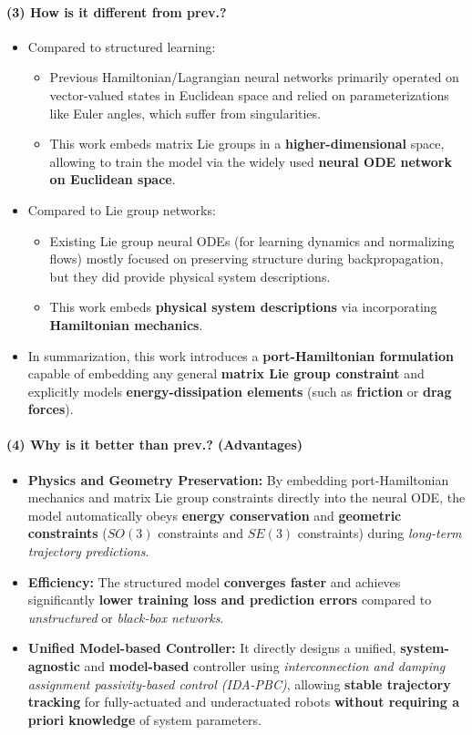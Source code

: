 \documentclass{article}
\begin{document}
\paragraph{(3) How is it different from prev.?}
\begin{itemize}
  \item Compared to structured learning:
  \begin{itemize}
    \item Previous Hamiltonian/Lagrangian neural networks primarily operated on vector-valued states in Euclidean space and relied on parameterizations like Euler angles, which suffer from singularities.
    \item This work embeds matrix Lie groups in a \textbf{higher-dimensional} space, allowing to train the model via the widely used \textbf{neural ODE network on Euclidean space}.
  \end{itemize}
  \item Compared to Lie group networks:
  \begin{itemize}
    \item Existing Lie group neural ODEs (for learning dynamics and normalizing flows) mostly focused on preserving structure during backpropagation, but they did provide physical system descriptions.
    \item This work embeds \textbf{physical system descriptions} via incorporating \textbf{Hamiltonian mechanics}.
  \end{itemize}
  \item In summarization, this work introduces a \textbf{port-Hamiltonian formulation} capable of embedding any general \textbf{matrix Lie group constraint} and explicitly models \textbf{energy-dissipation elements} (such as \textbf{friction} or \textbf{drag forces}).
\end{itemize}

\paragraph{(4) Why is it better than prev.? (Advantages)} 
\begin{itemize}
  \item \textbf{Physics and Geometry Preservation:} By embedding port-Hamiltonian mechanics and matrix Lie group constraints directly into the neural ODE, the model automatically obeys \textbf{energy conservation} and \textbf{geometric constraints} ($SO(3)$ constraints and $SE(3)$ constraints) during \textit{long-term trajectory predictions}.
  \item \textbf{Efficiency:} The structured model \textbf{converges faster} and achieves significantly \textbf{lower training loss and prediction errors} compared to \textit{unstructured} or \textit{black-box networks}.
  \item \textbf{Unified Model-based Controller:} It directly designs a unified, \textbf{system-agnostic} and \textbf{model-based} controller using \textit{interconnection and damping assignment passivity-based control (IDA-PBC)}, allowing \textbf{stable trajectory tracking} for fully-actuated and underactuated robots \textbf{without requiring a priori knowledge} of system parameters.
\end{itemize}
\end{document}

